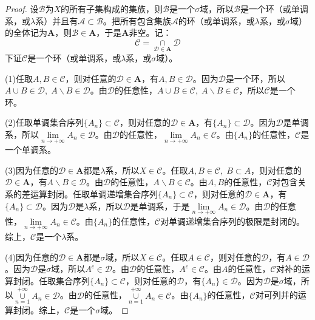 \begin{proof}
	设$\mathscr{B}$为$X$的所有子集构成的集族，则$\mathscr{B}$是一个$\sigma$域，所以$\mathscr{B}$是一个环（或单调系，或$\lambda$系）并且有$\mathscr{A}\subset\mathscr{B}$。把所有包含集族$\mathscr{A}$的环（或单调系，或$\lambda$系，或$\sigma$域）的全体记为$\mathbf{A}$，则$\mathscr{B}\in \mathbf{A}$，于是$\mathbf{A}$非空。记：
	\begin{equation*}
		\mathscr{C}=\underset{\mathscr{D}\in \mathbf{A}}{\cap}\mathscr{D}
	\end{equation*}
	下证$\mathscr{C}$是一个环（或单调系，或$\lambda$系，或$\sigma$域）。\par
	(1)任取$A,B\in\mathscr{C}$，则对任意的$\mathscr{D}\in\mathbf{A}$，有$A,B\in\mathscr{D}$。因为$\mathscr{D}$是一个环，所以$A\cup B\in\mathscr{D},\;A\backslash B\in\mathscr{D}$。由$\mathscr{D}$的任意性，$A\cup B\in\mathscr{C},\;A\backslash B\in\mathscr{C}$，所以$\mathscr{C}$是一个环。\par
	(2)任取单调集合序列$\{A_n\}\subset\mathscr{C}$，则对任意的$\mathscr{D}\in\mathbf{A}$，有$\{A_n\}\subset\mathscr{D}$。因为$\mathscr{D}$是单调系，所以$\lim\limits_{n\to+\infty}A_n\in\mathscr{D}$。由$\mathscr{D}$的任意性，$\lim\limits_{n\to+\infty}A_n\in\mathscr{C}$。由$\{A_n\}$的任意性，$\mathscr{C}$是一个单调系。\par
	(3)因为任意的$\mathscr{D}\in\mathbf{A}$都是$\lambda$系，所以$X\in\mathscr{C}$。任取$A,B\in\mathscr{C},\;B\subset A$，则对任意的$\mathscr{D}\in\mathbf{A}$，有$A\backslash B\in\mathscr{D}$。由$\mathscr{D}$的任意性，$A\backslash B\in\mathscr{C}$。由$A,B$的任意性，$\mathscr{C}$对包含关系的差运算封闭。任取单调递增集合序列$\{A_n\}\subset\mathscr{C}$，则对任意的$\mathscr{D}\in\mathbf{A}$，有$\{A_n\}\subset\mathscr{D}$。因为$\mathscr{D}$是$\lambda$系，所以$\mathscr{D}$是单调系，于是$\lim\limits_{n\to+\infty}A_n\in\mathscr{D}$。由$\mathscr{D}$的任意性，$\lim\limits_{n\to+\infty}A_n\in\mathscr{C}$。由$\{A_n\}$的任意性，$\mathscr{C}$对单调递增集合序列的极限是封闭的。综上，$\mathscr{C}$是一个$\lambda$系。\par
	(4)因为任意的$\mathscr{D}\in\mathbf{A}$都是$\sigma$域，所以$X\in\mathscr{C}$。任取$A\in\mathscr{C}$，则对任意的$\mathscr{D}$，有$A\in\mathscr{D}$。因为$\mathscr{D}$是$\sigma$域，所以$A^c\in\mathscr{D}$。由$\mathscr{D}$的任意性，$A^c\in\mathscr{C}$。由$A$的任意性，$\mathscr{C}$对补的运算封闭。任取集合序列$\{A_n\}\subset\mathscr{C}$，则对任意的$\mathscr{D}$，有$\{A_n\}\in\mathscr{D}$。因为$\mathscr{D}$是$\sigma$域，所以$\underset{n=1}{\overset{+\infty}{\cup}}A_n\in\mathscr{D}$。由$\mathscr{D}$的任意性，$\underset{n=1}{\overset{+\infty}{\cup}}A_n\in\mathscr{C}$。由$\{A_n\}$的任意性，$\mathscr{C}$对可列并的运算封闭。综上，$\mathscr{C}$是一个$\sigma$域。
\end{proof}
